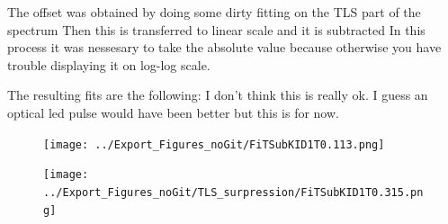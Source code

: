 The offset was obtained by doing some dirty fitting on the TLS part of the spectrum
Then this is transferred to linear scale and it is subtracted
In this process it was nessesary to take the absolute value because otherwise you have trouble displaying it on log-log scale.

The resulting fits are the following:
I don't think this is really ok. I guess an optical led pulse would have been better but this is for now.

\begin{figure}[ht]
	\centering
	\texttt{[image: ../Export\_Figures\_noGit/FiTSubKID1T0.113.png]}
	\caption{}
	\label{fig:}
\end{figure}
\begin{figure}[ht]
	\centering
	\texttt{[image: ../Export\_Figures\_noGit/TLS\_surpression/FiTSubKID1T0.315.png]}
	\caption{}
	\label{fig:}
\end{figure}
\FloatBarrier

